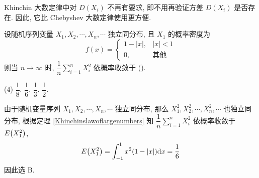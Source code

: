 Khinchin 大数定律中对 $ D\left(X_{i}\right) $ 不再有要求, 即不用再验证方差 $ D\left(X_{i}\right) $ 是否存在.
因此, 它比 Chebyshev 大数定律使用更方便.

\begin{example}
    设随机序列变量 $X_1, X_2, \cdots ,X_n, \cdots $ 独立同分布, 且 $X_1$ 的概率密度为 $$f(x)=\begin{cases}
            1-|x|, & |x|<1 \\ 0,&\text{其他}
        \end{cases}$$ 则当 $n\to \infty$ 时, $\displaystyle \dfrac{1}{n}\sum_{i=1}^{n} X_i^2$ 依概率收敛于 (\quad).
    \begin{tasks}(4)
        \task $\dfrac{1}{8}$.
        \task $\dfrac{1}{6}$.
        \task $\dfrac{1}{3}$.
        \task $\dfrac{1}{2}$.
    \end{tasks}
\end{example}
\begin{solution}
    由于随机变量序列  $X_1, X_2, \cdots ,X_n, \cdots $ 独立同分布, 那么  $X_1^2, X_2^2, \cdots ,X_n^2, \cdots $ 也独立同分布,
    根据定理 \ref{Khinchinslawoflargenumbers} 知 $\displaystyle \dfrac{1}{n}\sum_{i=1}^{n} X_i^2$ 依概率收敛于 $E\qty(X_1^2)$,
    $$
        E\qty(X_1^2)=\int_{-1}^{1} x^2(1-|x|) \dd x=\dfrac{1}{6}
    $$
    因此选 B.
\end{solution}
